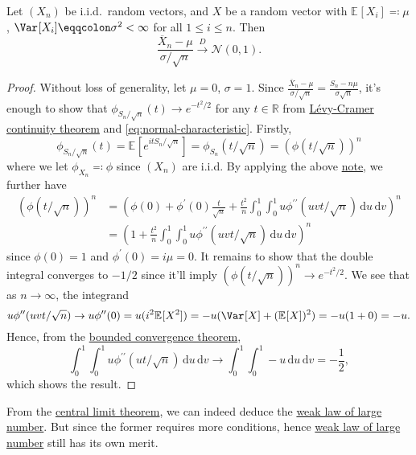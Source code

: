 \begin{theorem}\label{thm:CLT}
	Let \((X_n)\) be i.i.d.\ random vectors, and \(X\) be a random vector with \(\mathbb{E}_{}[X_i] \eqqcolon \mu \), \(\Var_{}[X_i] \eqqcolon \sigma ^2 < \infty \) for all \(1 \leq i \leq n\). Then
	\[
		\frac{\overline{X} _n - \mu }{\sigma / \sqrt{n} } \overset{D}{\to } \mathcal{N} (0, 1).
	\]
\end{theorem}
\begin{proof}
	Without loss of generality, let \(\mu = 0\), \(\sigma = 1\). Since \(\frac{\overline{X} _n - \mu }{\sigma / \sqrt{n} } = \frac{S_n - n \mu }{\sigma \sqrt{n} }\), it's enough to show that \(\phi _{S_n / \sqrt{n} }(t) \to e^{-t^2 / 2}\) for any \(t \in \mathbb{R} \) from \hyperref[thm:Levy-Cramer-continuity]{Lévy-Cramer continuity theorem} and \autoref{eq:normal-characteristic}. Firstly,
	\[
		\phi _{S_n / \sqrt{n} } (t)
		= \mathbb{E}_{}[e^{i t S_n / \sqrt{n} }]
		= \phi _{S_n} (t / \sqrt{n} )
		= \left( \phi (t / \sqrt{n} ) \right) ^n
	\]
	where we let \(\phi _{X_n} \eqqcolon \phi \) since \((X_n)\) are i.i.d. By applying the above \hyperref[note:lec10]{note}, we further have
	\[
		\begin{split}
			\left( \phi (t / \sqrt{n} ) \right) ^n
			 & = \left( \phi (0) + \phi ^{\prime} (0) \frac{t}{\sqrt{n} } + \frac{t^2}{n} \int_{0}^{1} \int_{0}^{1} u \phi ^{\prime\prime} (u v t / \sqrt{n} ) \,\mathrm{d}u  \,\mathrm{d}v  \right) ^n \\
			 & = \left( 1 + \frac{t^2}{n}\int_{0}^{1} \int_{0}^{1} u \phi ^{\prime\prime} (u v t / \sqrt{n} ) \,\mathrm{d}u  \,\mathrm{d}v \right) ^n
		\end{split}
	\]
	since \(\phi (0) = 1\) and \(\phi ^{\prime} (0) = i \mu = 0\). It remains to show that the double integral converges to \(- 1 / 2\) since it'll imply \((\phi (t / \sqrt{n} ))^n \to e^{-t^2 / 2}\). We see that as \(n \to \infty \), the integrand
	\[
		u \phi ^{\prime\prime} (u v t / \sqrt{n} )
		\to u \phi ^{\prime\prime} (0)
		= u (i^2 \mathbb{E}_{}[X^2])
		= - u (\Var_{}[X] + (\mathbb{E}_{}[X] )^2 )
		= - u (1 + 0)
		= -u.
	\]
	Hence, from the \href{https://en.wikipedia.org/wiki/Dominated_convergence_theorem}{bounded convergence theorem},
	\[
		\int_{0}^{1} \int_{0}^{1} u \phi ^{\prime\prime} (u t / \sqrt{n} ) \,\mathrm{d}u \,\mathrm{d}v
		\to \int_{0}^{1} \int_{0}^{1} -u \,\mathrm{d}u \,\mathrm{d}v
		= -\frac{1}{2},
	\]
	which shows the result.
\end{proof}

\begin{remark}
	From the \hyperref[thm:CLT]{central limit theorem}, we can indeed deduce the \hyperref[thm:WLLN]{weak law of large number}. But since the former requires more conditions, hence \hyperref[thm:WLLN]{weak law of large number} still has its own merit.
\end{remark}

